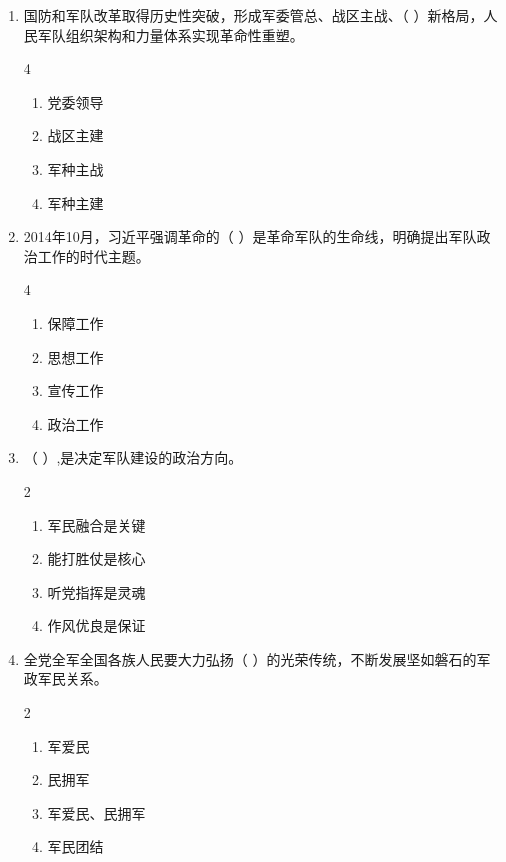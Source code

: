 \documentclass[a4paper,11pt]{ctexart}
\begin{document}
\begin{enumerate}
    \item 国防和军队改革取得历史性突破，形成军委管总、战区主战、（ ）新格局，人民军队组织架构和力量体系实现革命性重塑。
    \begin{multicols}{4}
    \begin{enumerate}
        \item 党委领导
        \item 战区主建
        \item 军种主战
        \item 军种主建
    \end{enumerate}
    \end{multicols}

    \item 2014年10月，习近平强调革命的（ ）是革命军队的生命线，明确提出军队政治工作的时代主题。
    \begin{multicols}{4}
    \begin{enumerate}
        \item 保障工作
        \item 思想工作
        \item 宣传工作
        \item 政治工作
    \end{enumerate}
    \end{multicols}

    \item （ ）,是决定军队建设的政治方向。
    \begin{multicols}{2}
    \begin{enumerate}
        \item 军民融合是关键
        \item 能打胜仗是核心
        \item 听党指挥是灵魂
        \item 作风优良是保证
    \end{enumerate}
    \end{multicols}

    \item 全党全军全国各族人民要大力弘扬（ ）的光荣传统，不断发展坚如磐石的军政军民关系。
    \begin{multicols}{2}
    \begin{enumerate}
        \item 军爱民
        \item 民拥军
        \item 军爱民、民拥军
        \item 军民团结
    \end{enumerate}
    \end{multicols}


\end{enumerate}
\end{document}

